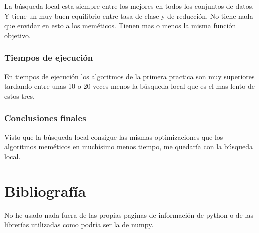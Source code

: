 \documentclass[titlepage]{article}
\begin{document}
	La búsqueda local esta siempre entre los mejores en todos los conjuntos de datos. Y tiene un muy buen equilibrio entre tasa de clase y de reducción. No tiene nada que envidar en esto a los meméticos. Tienen mas o menos la misma función objetivo.  
	
	\subsubsection{Tiempos de ejecución}
	En tiempos de ejecución  los algoritmos de la primera practica son muy superiores tardando entre unas 10 o 20 veces menos la búsqueda local que es el mas lento de estos tres.
	
	\subsubsection{Conclusiones finales}
	Visto que la búsqueda local consigue las mismas optimizaciones que los algoritmos meméticos en muchísimo menos tiempo, me quedaría con la búsqueda local. 
	
	
	
	
	
	
	\section{Bibliografía}
	No he usado nada fuera de las propias paginas de información de python o de las librerías utilizadas como podría ser la de numpy.
	
	\
  
\end{document}
